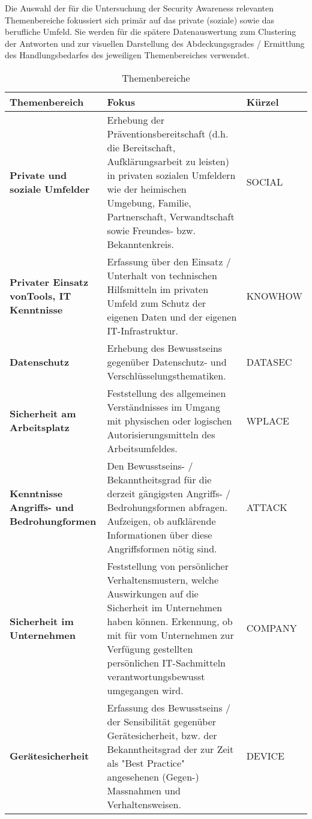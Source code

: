 \documentclass[../../main.tex]{subfiles}
\begin{document}
\begin{sloppypar}
Die Auswahl der für die Untersuchung der Security Awareness relevanten Themenbereiche fokussiert sich primär auf das private (soziale) sowie das berufliche Umfeld. Sie werden für die spätere Datenauswertung zum Clustering der Antworten und zur visuellen Darstellung des Abdeckungsgrades / Ermittlung des Handlungsbedarfes des jeweiligen Themenbereiches verwendet.
\end{sloppypar}



\sloppy 

\begin{table}[H]
\tablefontsize	
\centering
\caption{Themenbereiche}
\label{themenbereiche}

\begin{tabular}{ |p{4cm}|p{9.5cm}|p{2.0cm}|}

\hline
\tableheaderbgcolor
\textbf{Themenbereich} & \textbf{Fokus} & \textbf{Kürzel}\\ 
\hline
\textbf{Private und \newline soziale Umfelder} & Erhebung der Präventionsbereitschaft (d.h. die Bereitschaft, Aufklärungsarbeit zu leisten) in privaten sozialen Umfeldern wie der heimischen Umgebung, Familie, Partnerschaft, Verwandtschaft sowie Freundes- bzw. Bekanntenkreis. & SOCIAL\\
\hline
\textbf{Privater Einsatz von\newline Tools, IT Kenntnisse} & Erfassung über den Einsatz / Unterhalt von technischen Hilfsmitteln im privaten Umfeld zum Schutz der eigenen Daten und der eigenen IT-Infrastruktur. & KNOWHOW\\
\hline
\textbf{Datenschutz} & Erhebung des Bewusstseins gegenüber Datenschutz- und Verschlüsselungsthematiken. & DATASEC\\
\hline
\textbf{Sicherheit am \newline Arbeitsplatz} & Feststellung des allgemeinen Verständnisses im Umgang mit physischen oder logischen Autorisierungsmitteln des Arbeitsumfeldes. & WPLACE\\
\hline
\textbf{Kenntnisse Angriffs- \newline und Bedrohungformen} & Den Bewusstseins- / Bekanntheitsgrad für die derzeit gängigsten Angriffs- / Bedrohungsformen abfragen. Aufzeigen, ob aufklärende Informationen über diese Angriffsformen nötig sind. & ATTACK\\
\hline
\textbf{Sicherheit im \newline Unternehmen} & Feststellung von persönlicher Verhaltensmustern, welche Auswirkungen auf die Sicherheit im Unternehmen haben können. Erkennung, ob mit für vom Unternehmen zur Verfügung gestellten persönlichen IT-Sachmitteln verantwortungsbewusst umgegangen wird. & COMPANY\\
\hline
\textbf{Gerätesicherheit} & Erfassung des Bewusstseins / der Sensibilität gegenüber Gerätesicherheit, bzw. der Bekanntheitsgrad der zur Zeit als "Best Practice" angesehenen (Gegen-) Massnahmen und Verhaltensweisen. & DEVICE\\
\hline

\end{tabular}
\end{table}
\end{document}
